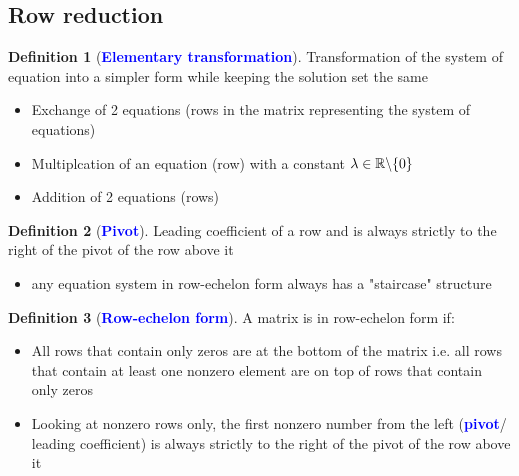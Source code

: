 \documentclass[12pt]{article}
\theoremstyle{definition}
\newtheorem{definition}{Definition}[section]
\newcommand{\subkeyword}[1]{\textbf{\textcolor{blue}{#1}}}
\begin{document}
        \subsection{Row reduction}
            \begin{definition}[\subkeyword{Elementary transformation}]
                Transformation of the system of equation into a simpler form while
                keeping the solution set the same
                \begin{itemize}
                    \item Exchange of 2 equations (rows in the matrix representing
                        the system of equations)
                    \item Multiplcation of an equation (row) with a constant 
                        $\lambda\in\mathbb{R}\symbol{92}\{0\}$
                    \item Addition of 2 equations (rows)
                \end{itemize}
            \end{definition}
            \begin{definition}[\subkeyword{Pivot}]
                Leading coefficient of a row and is always strictly to the right 
                of the pivot of the row above it
                \begin{itemize}
                    \item any equation system in row-echelon form always has a 
                        "staircase" structure
                \end{itemize}
            \end{definition}
            \begin{definition}[\subkeyword{Row-echelon form}]
                A matrix is in row-echelon form if:
                \begin{itemize}
                    \item All rows that contain only zeros are at the bottom of
                        the matrix i.e. all rows that contain at least one 
                        nonzero element are on top of rows that contain only zeros
                    \item Looking at nonzero rows only, the first nonzero number
                        from the left (\subkeyword{pivot}/ leading coefficient) 
                        is always strictly to the right of the pivot of the row
                        above it
                \end{itemize}
            \end{definition}
\end{document}
